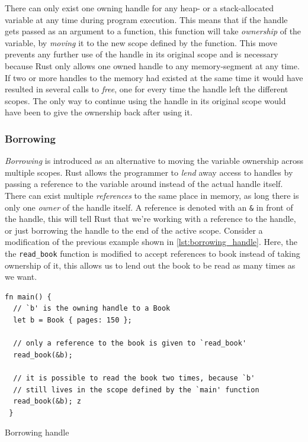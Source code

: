 There can only exist one owning handle for any heap- or a stack-allocated variable at any time during program execution.
This means that if the handle gets passed as an argument to a function, this function will take \emph{ownership} of the variable, by \emph{moving} it to the new scope defined by the function.
This move prevents any further use of the handle in its original scope and is necessary because Rust only allows one owned handle to any memory-segment at any time.
If two or more handles to the memory had existed at the same time it would have resulted in several calls to \emph{free}, one for every time the handle left the different scopes.
The only way to continue using the handle in its original scope would have been to give the ownership back after using it.

\subsubsection{Borrowing}

\emph{Borrowing} is introduced as an alternative to moving the variable ownership across multiple scopes.
Rust allows the programmer to \emph{lend} away access to handles by passing a reference to the variable around instead of the actual handle itself.
There can exist multiple \emph{references} to the same place in memory, as long there is only one \emph{owner} of the handle itself.
A reference is denoted with an \texttt{\&} in front of the handle, this will tell Rust that we're working with a reference to the handle, or just borrowing the handle to the end of the active scope.
Consider a modification of the previous example shown in \autoref{lst:borrowing_handle}.
Here, the the \texttt{read\_book} function is modified to accept references to book instead of taking ownership of it, this allows us to lend out the book to be read as many times as we want.

\begin{listing}[tb]
\begin{verbatim}
fn main() {
  // `b' is the owning handle to a Book
  let b = Book { pages: 150 };

  // only a reference to the book is given to `read_book'
  read_book(&b);

  // it is possible to read the book two times, because `b'
  // still lives in the scope defined by the `main' function
  read_book(&b); z
 }
\end{verbatim}
\caption{Borrowing handle}
\label{lst:borrowing_handle}
\end{listing}

